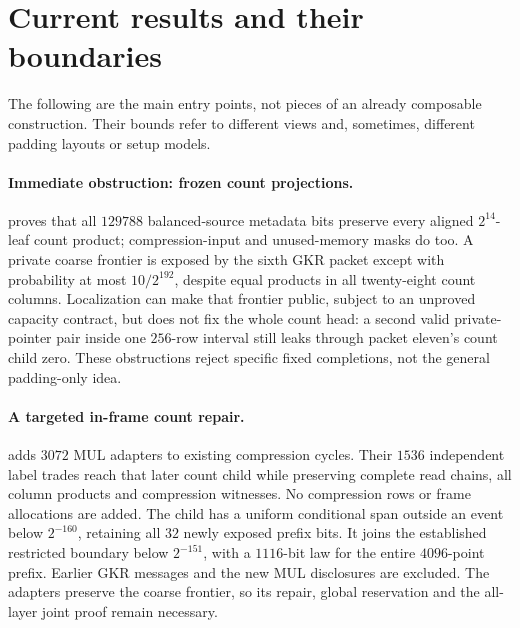 \section{Current results and their boundaries}\label{sec:zk-status}

The following are the main entry points, not pieces of an already composable construction. Their bounds refer to different views and, sometimes, different padding layouts or setup models.

\paragraph{Immediate obstruction: frozen count projections.}  proves that all $129788$ balanced-source metadata bits preserve every aligned $2^{14}$-leaf count product; compression-input and unused-memory masks do too. A private coarse frontier is exposed by the sixth GKR packet except with probability at most $10/2^{192}$, despite equal products in all twenty-eight count columns. Localization can make that frontier public, subject to an unproved capacity contract, but does not fix the whole count head: a second valid private-pointer pair inside one $256$-row interval still leaks through packet eleven's count child zero. These obstructions reject specific fixed completions, not the general padding-only idea.

\paragraph{A targeted in-frame count repair.}  adds $3072$ MUL adapters to existing compression cycles. Their $1536$ independent label trades reach that later count child while preserving complete read chains, all column products and compression witnesses. No compression rows or frame allocations are added. The child has a uniform conditional span outside an event below $2^{-160}$, retaining all $32$ newly exposed prefix bits. It joins the established restricted boundary below $2^{-151}$, with a $1116$-bit law for the entire $4096$-point prefix. Earlier GKR messages and the new MUL disclosures are excluded. The adapters preserve the coarse frontier, so its repair, global reservation and the all-layer joint proof remain necessary.

